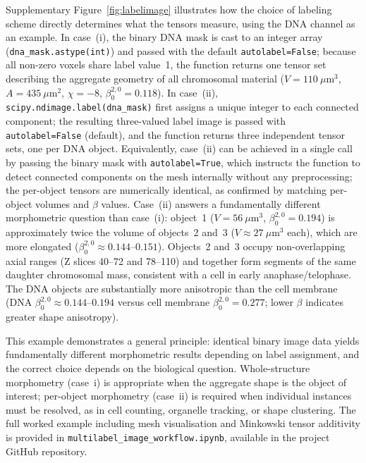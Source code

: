 \documentclass[times, twoside, watermark]{zHenriquesLab-StyleBioRxiv}
\newcommand{\replaced}[3][]{#2}     %
\begin{document}
Supplementary Figure~\ref{fig:labelimage} illustrates how the choice of labeling scheme directly determines what the tensors measure, using the DNA channel as an example.
In case~(i), the binary DNA mask is cast to an integer array (\texttt{dna\_mask.astype(int)}) and passed with the default \texttt{autolabel=False}; because all non-zero voxels share label value~1, the function returns one tensor set describing the aggregate geometry of all chromosomal material ($V = 110~\mu\text{m}^3$, $A = 435~\mu\text{m}^2$, \replaced{$\chi = -8$}{$\chi = 2$ (a topologically closed, simply connected surface)}, $\beta_0^{2,0} = 0.118$).
In case~(ii), \texttt{scipy.ndimage.label(dna\_mask)} first assigns a unique integer to each connected component; the resulting three-valued label image is passed with \texttt{autolabel=False} (default), and the function returns three independent tensor sets, one per DNA object.
Equivalently, case~(ii) can be achieved in a single call by passing the binary mask with \texttt{autolabel=True}, which instructs the function to detect connected components on the mesh internally without any preprocessing; the per-object tensors are numerically identical, as confirmed by matching per-object volumes and $\beta$ values.
Case~(ii) answers a fundamentally different morphometric question than case~(i): object~1 ($V = 56~\mu\text{m}^3$, $\beta_0^{2,0} = 0.194$) is approximately twice the volume of objects~2 and~3 ($V \approx 27~\mu\text{m}^3$ each), which are more elongated ($\beta_0^{2,0} \approx 0.144$--$0.151$).
Objects~2 and~3 occupy non-overlapping axial ranges (Z slices 40--72 and 78--110) and together form segments of the same daughter chromosomal mass, consistent with a cell in early anaphase/telophase.
The DNA objects are substantially more anisotropic than the cell membrane (DNA $\beta_0^{2,0} \approx 0.144$--$0.194$ versus cell membrane $\beta_0^{2,0} = 0.277$; lower $\beta$ indicates greater shape anisotropy).

This example demonstrates a general principle: identical binary image data yields fundamentally different morphometric results depending on label assignment, and the correct choice depends on the biological question.
Whole-structure morphometry (case~i) is appropriate when the aggregate shape is the object of interest; per-object morphometry (case~ii) is required when individual instances must be resolved, as in cell counting, organelle tracking, or shape clustering.
The full worked example including mesh visualisation and Minkowski tensor additivity is provided in \texttt{multilabel\_image\_workflow.ipynb}, available in the project GitHub repository.
\end{document}
